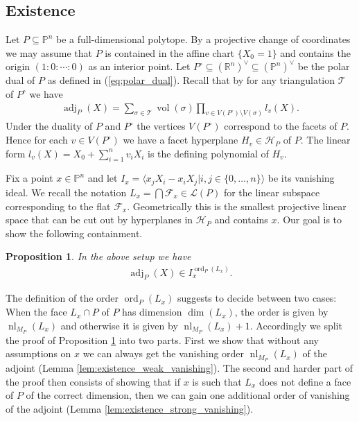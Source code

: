 \documentclass[a4paper,10pt]{amsart}
\theoremstyle{definition}
\theoremstyle{plain}
\newtheorem{prop}[defin]{Proposition}
\newcommand{\ord}{\operatorname{ord}}
\newcommand{\adj}{\operatorname{adj}} %
\newcommand{\nl}{\operatorname{nl}}
\newcommand{\vol}{\operatorname{vol}}
\newcommand{\cF}{{\mathcal F}}
\newcommand{\cH}{{\mathcal H}}
\newcommand{\cL}{{\mathcal L}}
\newcommand{\cT}{{\mathcal T}}
\newcommand{\R}{{\mathbb R}}
\newcommand{\pp}{\mathbb{P}}
\begin{document}
\subsection{Existence} 
Let $P\subseteq \pp^n$ be a full-dimensional polytope. By a projective change of coordinates we may assume that $P$ is contained in the affine chart $\{X_0=1\}$ and contains the origin $(1:0:\cdots:0)$ as  an interior point. Let $P^\circ\subseteq (\R^n)^\vee \subseteq (\pp^n)^\vee$ be the polar dual of $P$ as defined in (\ref{eq:polar_dual}). Recall that by \cite[Theorem 4]{Warren1996Adjoints} for any triangulation $\cT$ of $P^\circ$ we have \begin{align}
\label{eq:triangulation_formula}
    \adj_P(X)=\sum_{\sigma\in \cT}\vol(\sigma)\prod_{v\in V(P^\circ)\setminus V(\sigma)}l_v(X).
\end{align}
Under the duality of $P$ and $P^\circ$ the vertices $V(P^\circ)$ correspond to the facets of $P$. Hence for each $v\in V(P^\circ)$ we have a facet hyperplane $H_v\in \cH_P$ of $P$. The linear form $l_v(X)=X_0+\sum_{i=1}^nv_iX_i$ is the defining polynomial of $H_v$. 

Fix a point $x \in \pp^n$ and let $I_x=\langle x_jX_i-x_iX_j | i,j \in \{0,\ldots,n\}\rangle$ be its vanishing ideal. We recall the notation $L_x=\bigcap \cF_x\in \cL(P)$ for the linear subspace corresponding to the flat $\cF_x$. Geometrically this is the smallest projective linear space that can be cut out by hyperplanes in $\cH_P$ and contains $x$.  Our goal is to show the following containment.

 \begin{prop}
 \label{prop:existence}
     In the above setup we have \begin{align*}
        \adj_P(X)\in I_x^{\ord_P(L_x)}.
     \end{align*}
 \end{prop}

The definition of the order $\ord_P(L_x)$ suggests to decide between two cases: When the face $L_x\cap P$  of $P$ has dimension $\dim(L_x)$, the order is given by $\nl_{M_P}(L_x)$ and otherwise it is given by $\nl_{M_P}(L_x)+1$. Accordingly we split the proof of Proposition \ref{prop:existence} into two parts. First we show that without any assumptions on $x$ we can always get the vanishing order $\nl_{M_P}(L_x)$ of the adjoint (Lemma \ref{lem:existence_weak_vanishing}). The second and harder part of the proof then consists of showing that if $x$ is such that $L_x$ does not define a face of $P$ of the correct dimension, then we can gain one additional order of vanishing of the adjoint (Lemma \ref{lem:existence_strong_vanishing}).
\end{document}
